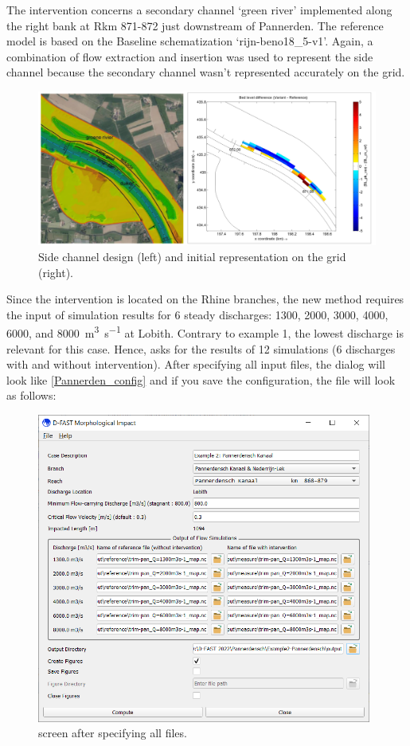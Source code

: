 The intervention concerns a secondary channel `green river' implemented along the right bank at Rkm 871-872 just downstream of Pannerden.
The reference model is based on the Baseline schematization ‘rijn-beno18\_5-v1’.
Again, a combination of flow extraction and insertion was used to represent the side channel because the secondary channel wasn't represented accurately on the grid.

\begin{figure}
\includegraphics[width=\columnwidth]{figures/Pannerden_proj.png}
\caption{Side channel design (left) and initial representation on the grid (right).}
\label{Pannerden_proj}
\end{figure}

Since the intervention is located on the Rhine branches, the new \dfastmi method requires the input of simulation results for 6 steady discharges: 1300, 2000, 3000, 4000, 6000, and \SI{8000}{\metre\cubed\per\second} at Lobith.
Contrary to example 1, the lowest discharge is relevant for this case.
Hence, \dfmi asks for the results of 12 simulations (6 discharges with and without intervention).
After specifying all input files, the dialog will look like \autoref{Pannerden_config} and if you save the configuration, the file will look as follows:

\begin{figure}
\center
\includegraphics[width=11cm]{figures/Pannerden_config.png}
\caption{\dfmi screen after specifying all files.}
\label{Pannerden_config}
\end{figure}

